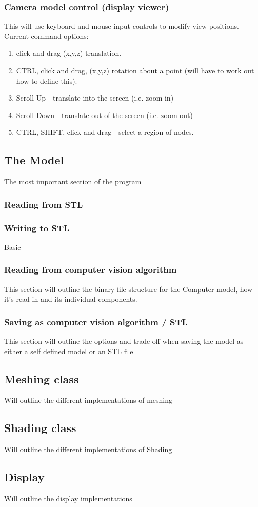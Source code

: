 \documentclass[11pt]{article}
\begin{document}
			\subsubsection{Camera model control (display viewer)}
				This will use keyboard and mouse input controls to modify view positions.
				Current command options: 
					\begin{enumerate}
						\item click and drag (x,y,z) translation.
						\item CTRL, click and drag, (x,y,z) rotation about a point (will have to work out how to define this). 
						\item Scroll Up - translate into the screen (i.e. zoom in)
						\item Scroll Down - translate out of the screen (i.e. zoom out)
						\item CTRL, SHIFT, click and drag - select a region of nodes. 
					\end{enumerate}
		
		\subsection{The Model}
			The most important section of the program
			
			\subsubsection{Reading from STL} %
			\subsubsection{Writing to STL} %
				Basic 
			
			\subsubsection{Reading from computer vision algorithm} 
				This section will outline the binary file structure for the Computer model, how it's read in and its individual components. 
				
			\subsubsection{Saving as computer vision algorithm / STL} 
				This section will outline the options and trade off when saving the model as either a self defined model or an STL file
			
		\subsection{Meshing class} 
			Will outline the different implementations of meshing
		
		\subsection{Shading class} 
			Will outline the different implementations of Shading
		
		\subsection{Display} 
			Will outline the display implementations
			
			
\end{document}
